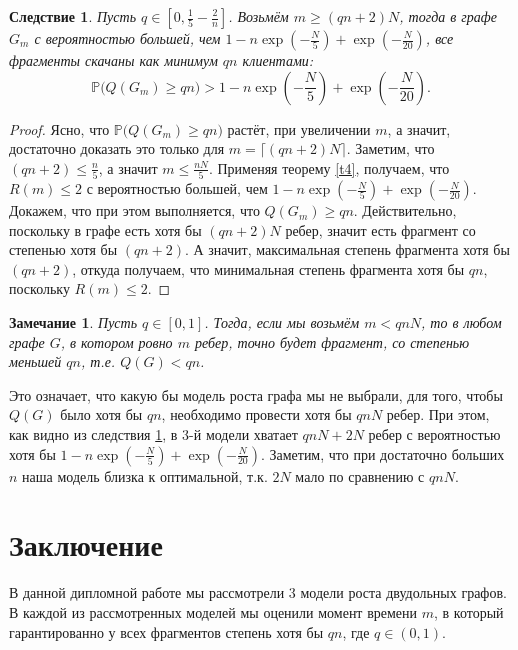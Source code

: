 \documentclass{matmex-diploma-custom}
\newcommand{\PRob}{\mathbb P}
\newcommand{\leqs}{\leqslant}
\newcommand{\geqs}{\geqslant}
\newtheorem{note}{Замечание}
\newtheorem{cons}{Следствие}
\theoremstyle{named}
\begin{document}
\begin{cons} \label{c2}
Пусть $q \in [0, \frac{1}{5} - \frac{2}{n}]$. 
Возьмём $m \geqs (qn + 2) N$, тогда в графе $G_m$ с вероятностью большей, чем 
$1 - n\exp\left(-\frac{N}{5}\right) +  \exp\left(- \frac{N}{20}\right)$, все фрагменты скачаны как минимум $qn$ клиентами:
\begin{equation}
\PRob\Big( Q(G_m) \geqs qn \Big) > 1 - n\exp\left(-\frac{N}{5}\right) +  \exp\left(- \frac{N}{20}\right).
\end{equation}
\end{cons}
\begin{proof}
Ясно, что $\PRob\Big( Q(G_m) \geqs qn \Big)$ растёт, при увеличении $m$, а значит, 
достаточно доказать это только для $m = \lceil(qn + 2) N\rceil$. 
Заметим, что $(qn + 2) \leqs \frac{n}{5}$, а значит $m \leqs \frac{nN}{5}$.
Применяя теорему \ref{t4}, получаем, что $R(m) \leqs 2$ с вероятностью большей, 
чем $1 - n\exp\left(-\frac{N}{5}\right) +  \exp\left(- \frac{N}{20}\right)$.
Докажем, что при этом выполняется, что $ Q(G_m) \geqs qn$.
Действительно, поскольку в графе есть хотя бы $(qn + 2) N$ ребер, значит есть фрагмент со степенью хотя бы $(qn + 2)$.
А значит, максимальная степень фрагмента хотя бы $(qn+2)$, откуда получаем, что минимальная степень фрагмента хотя бы $qn$, 
поскольку $R(m) \leqs 2$.
\end{proof}

\begin{note}
Пусть $q \in [0,1]$. Тогда, если мы возьмём $m < qnN$, то в любом графе $G$, в котором ровно $m$ ребер, точно будет фрагмент, 
со степенью меньшей $qn$, т.е. $Q(G) < qn$.
\end{note}

Это означает, что какую бы модель роста графа мы не выбрали, для того, чтобы~$Q(G)$ было хотя бы $qn$, необходимо
провести хотя бы $qnN$ ребер. 
При этом, как видно из следствия \ref{c2}, в 3-й модели хватает $qnN + 2N$ ребер
 с вероятностью хотя бы $1 - n\exp\left(-\frac{N}{5}\right) +  \exp\left(- \frac{N}{20}\right)$.
Заметим, что при достаточно больших $n$ наша модель близка к оптимальной, т.к. $2N$ мало по сравнению с $qnN$.
\newpage

\section*{Заключение}
В данной дипломной работе мы рассмотрели $3$ модели роста двудольных графов.
В каждой из рассмотренных моделей мы оценили момент времени $m$, 
в который гарантированно у всех фрагментов степень хотя бы $qn$, где $q \in (0,1)$.
\end{document}
